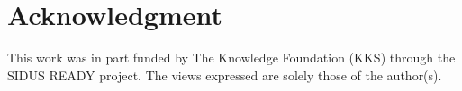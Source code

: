 \documentclass[10pt,conference]{IEEEtran}
\begin{document}
\section*{Acknowledgment}
This work was in part funded by The Knowledge Foundation (KKS) through the SIDUS READY project. The views expressed are solely those of the 
author(s).
   


\end{document}

